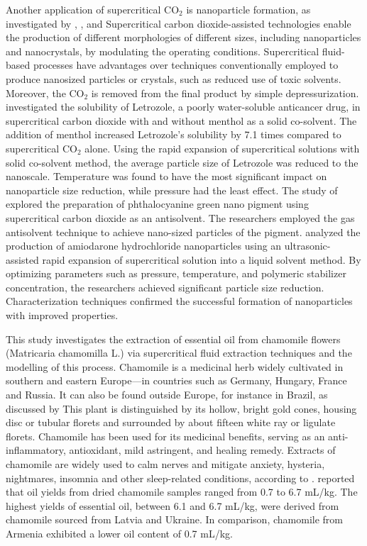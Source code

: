 \documentclass[a4paper,fleqn]{cas-dc}
\begin{document}
	Another application of supercritical CO$_2$ is nanoparticle formation, as investigated by \citet{Padrela2018}, \citet{Franco2021}, and \citet{Sodeifian2022} Supercritical carbon dioxide-assisted technologies enable the production of different morphologies of different sizes, including nanoparticles and nanocrystals, by modulating the operating conditions. Supercritical fluid-based processes have advantages over techniques conventionally employed to produce nanosized particles or crystals, such as reduced use of toxic solvents. Moreover, the CO$_2$ is removed from the final product by simple depressurization. 
	\citet{Sodeifian2018} investigated the solubility of Letrozole, a poorly water-soluble anticancer drug, in supercritical carbon dioxide with and without menthol as a solid co-solvent. The addition of menthol increased Letrozole's solubility by 7.1 times compared to supercritical CO$_2$ alone. Using the rapid expansion of supercritical solutions with solid co-solvent method, the average particle size of Letrozole was reduced to the nanoscale. Temperature was found to have the most significant impact on nanoparticle size reduction, while pressure had the least effect. 
	The study of \citet{SaadatiArdestani2020} explored the preparation of phthalocyanine green nano pigment using supercritical carbon dioxide as an antisolvent. The researchers employed the gas antisolvent technique to achieve nano-sized particles of the pigment.
	\citet{Sodeifian2019} analyzed the production of amiodarone hydrochloride nanoparticles using an ultrasonic-assisted rapid expansion of supercritical solution into a liquid solvent method. By optimizing parameters such as pressure, temperature, and polymeric stabilizer concentration, the researchers achieved significant particle size reduction. Characterization techniques confirmed the successful formation of nanoparticles with improved properties.
	
	This study investigates the extraction of essential oil from chamomile flowers (Matricaria chamomilla L.) via supercritical fluid extraction techniques and the modelling of this process. Chamomile is a medicinal herb widely cultivated in southern and eastern Europe---in countries such as Germany, Hungary, France and Russia. It can also be found outside Europe, for instance in Brazil, as discussed by \citet{Singh2011} This plant is distinguished by its hollow, bright gold cones, housing disc or tubular florets and surrounded by about fifteen white ray or ligulate florets. Chamomile has been used for its medicinal benefits, serving as an anti-inflammatory, antioxidant, mild astringent, and healing remedy. Extracts of chamomile are widely used to calm nerves and mitigate anxiety, hysteria, nightmares, insomnia and other sleep-related conditions, according to \citet{Srivastava2009}. \citet{Orav2010} reported that oil yields from dried chamomile samples ranged from 0.7 to 6.7 mL/kg. The highest yields of essential oil, between 6.1 and 6.7 mL/kg, were derived from chamomile sourced from Latvia and Ukraine. In comparison, chamomile from Armenia exhibited a lower oil content of 0.7 mL/kg.
	
\end{document}

